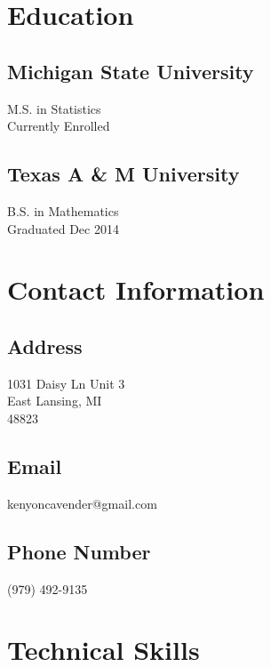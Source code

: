 \documentclass[12pt]{cavender_cv}
\begin{document}
\hspace{.75cm}\begin{minipage}[t]{0.25\textwidth}

\section{Education}
\subsection{Michigan State University}
\vspace{-4pt}
M.S. in Statistics \\
Currently Enrolled

\subsecspace

\subsection{Texas A \& M University}
\vspace{-4pt}
B.S. in Mathematics \\
Graduated Dec 2014

\subsecspace

\section{Contact Information}
\subsection{Address}
\vspace{-4pt}
1031 Daisy Ln Unit 3 \\
East Lansing, MI \\
48823

\subsecspace

\subsection{Email}
\vspace{-4pt}
kenyoncavender@gmail.com

\subsecspace

\subsection{Phone Number}
\vspace{-4pt}
(979) 492-9135

\subsecspace


\section{Technical Skills}

\end{minipage}
\end{document}
